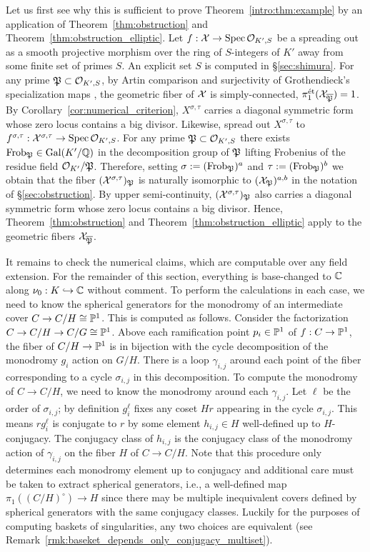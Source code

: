 \documentclass[main.tex]{subfiles}
\begin{document}
Let us first see why this is sufficient to prove Theorem~\ref{intro:thm:example} by an application of Theorem~\ref{thm:obstruction} and Theorem~\ref{thm:obstruction_elliptic}. Let $f : \X \to \Spec{\cO_{K',S}}$ be a spreading out as a smooth projective morphism over the ring of $S$-integers of $K'$ away from some finite set of primes $S$. An explicit set $S$ is computed in \S\ref{sec:shimura}. For any prime $\frP \subset \cO_{K',S}$, by Artin comparison \cite[Expos\'{e} XII, Cor. 5.2]{SGA1} and surjectivity of Grothendieck's specialization maps \cite[Expos\'{e} X, Cor. 2.3]{SGA1}, the geometric fiber of $\X$ is simply-connected, $\pi_1^{\et}(\X_{\ol{\frP}}) = 1$. By Corollary~\ref{cor:numerical_criterion}, $X^{\sigma, \tau}$ carries a diagonal symmetric form whose zero locus contains a big divisor. Likewise, spread out $X^{\sigma, \tau}$ to $f^{\sigma, \tau} : \X^{\sigma, \tau} \to \Spec{\cO_{K', S}}$. For any prime $\frP \subset \cO_{K',S}$ there exists $\Frob_{\frP} \in \Gal(K'/\Q)$ in the decomposition group of $\frP$ lifting Frobenius of the residue field $\cO_{K'} / \frP$. Therefore, setting $\sigma := (\Frob_{\frP})^a$ and $\tau := (\Frob_{\frP})^b$ we obtain that the fiber $(\X^{\sigma, \tau})_{\frP}$ is naturally isomorphic to $(\X_{\frP})^{a,b}$ in the notation of \S\ref{sec:obstruction}. By upper semi-continuity, $(\X^{\sigma, \tau})_{\frP}$ also carries a diagonal symmetric form whose zero locus contains a big divisor. Hence, Theorem~\ref{thm:obstruction} and Theorem~\ref{thm:obstruction_elliptic} apply to the geometric fibers $\X_{\ol{\frP}}$.
\par 
It remains to check the numerical claims, which are computable over any field extension. For the remainder of this section, everything is base-changed to $\CC$ along $\nu_0 : K \embed \CC$ without comment.
To perform the calculations in each case, we need to know the spherical generators for the monodromy of an intermediate cover $C \to C / H \cong \P^1$. This is computed as follows. Consider the factorization $C \to C / H \to C / G \cong \P^1$. Above each ramification point $p_i \in \P^1$ of $f : C \to \P^1$, the fiber of $C / H \to \P^1$ is in bijection with the cycle decomposition of the monodromy $g_i$ action on $G/H$. There is a loop $\gamma_{i,j}$ around each point of the fiber corresponding to a cycle $\sigma_{i,j}$ in this decomposition. To compute the monodromy of $C \to C / H$, we need to know the monodromy around each $\gamma_{i,j}$. Let $\ell$ be the order of $\sigma_{i,j}$; by definition $g_i^{\ell}$ fixes any coset $H r$ appearing in the cycle $\sigma_{i,j}$. This means $r g_i^{\ell}$ is conjugate to $r$ by some element $h_{i,j} \in H$ well-defined up to $H$-conjugacy. The conjugacy class of $h_{i,j}$ is the conjugacy class of the monodromy action of $\gamma_{i,j}$ on the fiber $H$ of $C \to C / H$. Note that this procedure only determines each monodromy element up to conjugacy and additional care must be taken to extract spherical generators, i.e., a well-defined map $\pi_1( (C/H)^\circ ) \to H$ since there may be multiple inequivalent covers defined by spherical generators with the same conjugacy classes. Luckily for the purposes of computing baskets of singularities, any two choices are equivalent (see Remark~\ref{rmk:baseket_depends_only_conjugacy_multiset}). 
\end{document}
